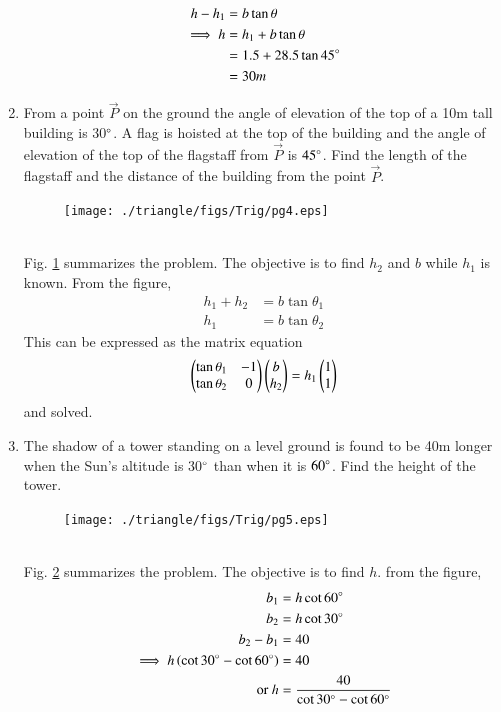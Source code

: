 \begin{enumerate}[label=\arabic*.,ref=\thesubsection.\theenumi]
\begin{align}
h-h_1 &=  b\tan \theta
\\
\implies h &= h_1+b\tan\theta 
\\
&= 1.5+28.5\tan45\degree 
\\
&= 30m
\end{align}
\item From a point $\vec{P}$ on the ground the angle of elevation of the top of a 10m tall building is 30$\degree$.  A flag is hoisted at the top of the building and the angle of elevation of the top of the flagstaff from $\vec{P}$ is $45\degree$.  Find the length of the flagstaff and the distance of the building from the point $\vec{P}$.
%
\begin{figure}[!ht]
\texttt{[image: ./triangle/figs/Trig/pg4.eps]}
\caption{}
\label{fig:trig_pg4}
\end{figure}
%
\\
\solution Fig. \ref{fig:trig_pg4} summarizes the problem. The objective is to find $h_2$ and $b$ while $h_1$ is known.  From the figure, 
%
\begin{align}
h_1+h_2 &=  b\tan \theta_1
\\
h_1 &= b\tan \theta_2
\end{align}
%
This can be expressed as the matrix equation 
%
\begin{align}
\begin{pmatrix}
\tan \theta_1 & -1
\\
\tan \theta_2 &0
\end{pmatrix}\begin{pmatrix}b\\h_2\end{pmatrix}
= h_1\begin{pmatrix}1\\1\end{pmatrix}
\end{align}
%
and solved.
\item The shadow of a tower standing on a level ground is found to be 40m longer when the Sun's altitude is 30$\degree$ than when it is $60\degree$.  Find the height of the tower.
%
\begin{figure}[!ht]
\texttt{[image: ./triangle/figs/Trig/pg5.eps]}
\caption{}
\label{fig:trig_pg5}
\end{figure}
%
\\
\solution Fig. \ref{fig:trig_pg5} summarizes the problem. The objective is to find $h$.  from the figure,
%
\begin{align}
b_1 &= h\cot 60\degree
\\
b_2 &= h\cot 30\degree
\\
b_2-b_1 &= 40
\\
\implies h \left(\cot 30\degree-\cot 60\degree\right)&= 40
\\
\text{or } h &= \frac{40}{\cot 30\degree-\cot 60\degree}
\end{align}

\end{enumerate}
